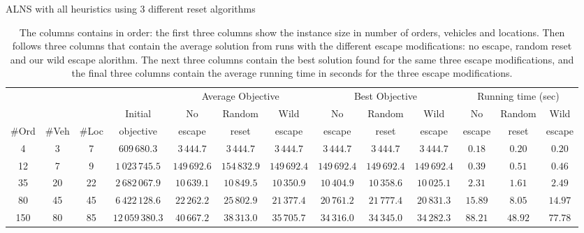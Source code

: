 \documentclass[../main.tex]{subfiles}
\begin{document}
\begin{table}
    \centering
    \caption{ALNS with all heuristics using 3 different reset algorithms}
    \begin{adjustbox}{width=\columnwidth,center}
            \begin{tabular}{|ccc|c|ccc|ccc|ccc|}
            \hline
                        &           &           &                   & \multicolumn{3}{c|}{Average Objective}        & \multicolumn{3}{c|}{Best Objective}            & \multicolumn{3}{c|}{Running time (sec)}   \\ 
                        &           &           & Initial           & No            & Random        & Wild          & No            & Random        & Wild          & No        & Random    & Wild      \\     
                \#Ord   & \#Veh     & \#Loc     & objective         & escape        & reset         & escape        & escape        & reset         & escape        & escape    & reset     & escape    \\
            \hline
                4       & 3         & 7         & $609\,680.3$      & $3\,444.7$    & $3\,444.7$    & $3\,444.7$    & $3\,444.7$    & $3\,444.7$    & $3\,444.7$    & $0.18$    & $0.20$    & $0.20$    \\
                12      & 7         & 9         & $1\,023\,745.5$   & $149\,692.6$  & $154\,832.9$  & $149\,692.4$  & $149\,692.4$  & $149\,692.4$  & $149\,692.4$  & $0.39$    & $0.51$    & $0.46$    \\
                35      & 20        & 22        & $2\,682\,067.9$   & $10\,639.1$   & $10\,849.5$   & $10\,350.9$   & $10\,404.9$   & $10\,358.6$   & $10\,025.1$   & $2.31$    & $1.61$    & $2.49$    \\
                80      & 45        & 45        & $6\,422\,128.6$   & $22\,262.2$   & $25\,802.9$   & $21\,377.4$   & $20\,761.2$   & $21\,777.4$   & $20\,831.3$   & $15.89$   & $8.05$    & $14.97$   \\
                150     & 80        & 85        & $12\,059\,380.3$  & $40\,667.2$   & $38\,313.0$   & $35\,705.7$   & $34\,316.0$   & $34\,345.0$   & $34\,282.3$   & $88.21$   & $48.92$   & $77.78$   \\
            \hline
            \end{tabular}
    \label{tab:wildComp}
    \end{adjustbox}
    \caption*{The columns contains in order: the first three columns show the instance size in number of orders, vehicles and locations. 
    Then follows three columns that contain the average solution from runs with the different escape modifications: no escape, random reset and our  wild escape alorithm. The next three columns contain the best solution found for the same three escape modifications, and the final three columns contain the average running time in seconds for the three escape modifications.}
\end{table}
\end{document}
